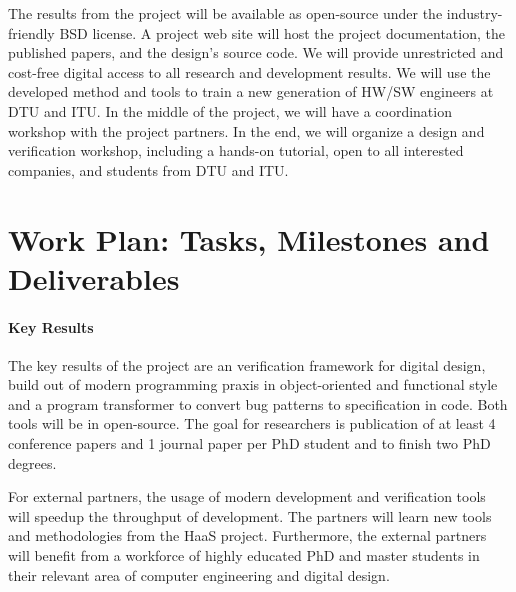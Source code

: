 \documentclass[fleqn,12pt]{article}
\newcommand{\todo}[1]{{\it TODO: #1}}
\begin{document}
The results from the project will be available as open-source under the
industry-friendly BSD license.
A project web site will host the project documentation, the published papers, and the design's source code.
We will provide unrestricted and cost-free digital access to all research and development results.
%
We will use the developed method and tools to train a new generation of HW/SW engineers
at DTU and ITU.
In the middle of the project, we will have a coordination workshop with the project partners.
In the end, we will organize a design and verification workshop, including a hands-on tutorial,
open to all interested companies, and students from DTU and ITU.



\section*{Work Plan: Tasks, Milestones and Deliverables}





\paragraph*{Key Results} The key results of the project are an verification framework for digital design, build
out of modern programming praxis in object-oriented and functional style and a program transformer
to convert bug patterns to specification in code. Both tools will be in open-source. The goal for researchers
is publication of at least 4 conference papers and 1 journal paper per PhD student and to finish two PhD
degrees.

For external partners, the usage of modern development and verification tools will speedup the
throughput of development. The partners will learn new tools and methodologies from the HaaS project.
Furthermore, the external partners will benefit from a workforce of highly educated PhD
and master students in their relevant area of computer engineering and digital design.
\end{document}
